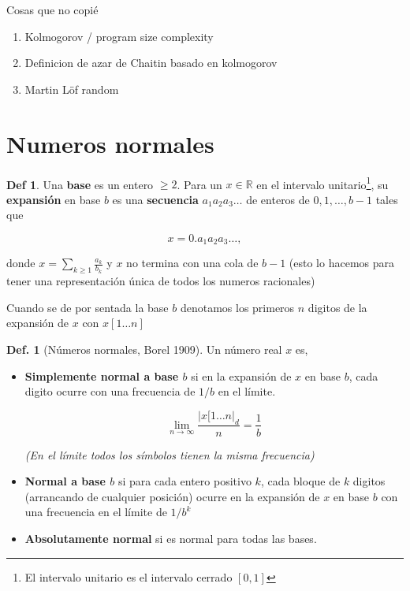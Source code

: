 \documentclass{report}
\theoremstyle{definition} %
\newtheorem{definition}{Def.}[chapter]
\newtheorem*{definition*}{Def}
\begin{document}
Cosas que no copié

\begin{enumerate}
    \item Kolmogorov / program size complexity
    \item Definicion de azar de Chaitin basado en kolmogorov
    \item Martin Löf random
\end{enumerate}

\section{Numeros normales}

\begin{definition*}
    Una \textbf{base} es un entero $\geq 2$. Para un $x \in \mathbb{R}$ en el
    intervalo unitario\footnote{El intervalo unitario es el intervalo cerrado
    $[0, 1]$}, su \textbf{expansión} en base $b$ es una \textbf{secuencia} $a_1
    a_2 a_3 \dots$ de enteros de ${0, 1, \dots, b-1}$ tales que

    $$x = 0.a_1 a_2 a_3 \dots,$$

    donde $x = \sum_{k \geq 1} \frac{a_k}{b_k}$ y $x$ no termina con una cola de
    $b - 1$ (esto lo hacemos para tener una representación única de todos los
    numeros racionales)

    Cuando se de por sentada la base $b$ denotamos los primeros $n$ digitos de
    la expansión de $x$ con $x[1\dots n]$
\end{definition*}


\begin{definition}[Números normales, Borel 1909]\label{def:normal-borel}
    Un número real $x$ es,
    \begin{itemize}
        \item \textbf{Simplemente normal a base $b$} si en la expansión de $x$
        en base $b$, cada digito ocurre con una frecuencia de $1/b$ en el
        límite.

        $$\lim_{n\to \infty} \frac{|x[1\dots n|_d}{n} = \frac{1}{b}$$

        \textit{(En el límite todos los símbolos tienen la misma frecuencia)}
        \item \textbf{Normal a base $b$} si para cada entero positivo $k$, cada
        bloque de $k$ digitos (arrancando de cualquier posición) ocurre en la
        expansión de $x$ en base $b$ con una frecuencia en el límite de $1/b^k$
        \item \textbf{Absolutamente normal} si es normal para todas las bases.
    \end{itemize}
\end{definition}
\end{document}

